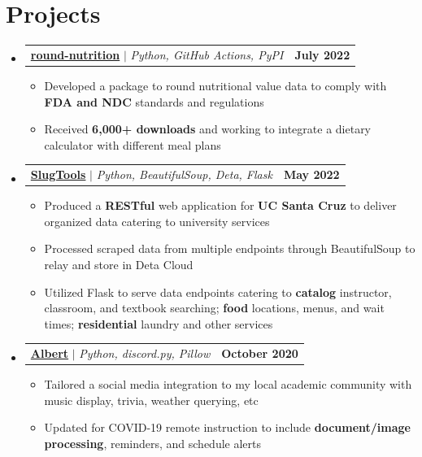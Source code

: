 \documentclass[letterpaper,11pt]{article}
\makeatletter
\newcommand{\resumeItem}[1]{
  \item\small{
    {#1 \vspace{-2pt}}
  }
}
\newcommand{\resumeProjectHeading}[2]{
    \item
    \begin{tabular*}{1.001\textwidth}{l@{\extracolsep{\fill}}r}
      \small#1 & \textbf{\small #2}\\
    \end{tabular*}\vspace{-7pt}
}
\newcommand{\resumeSubHeadingListStart}{\begin{itemize}[leftmargin=0.0in, label={}]}
\newcommand{\resumeSubHeadingListEnd}{\end{itemize}}
\newcommand{\resumeItemListStart}{\begin{itemize}}
\newcommand{\resumeItemListEnd}{\end{itemize}\vspace{-5pt}}
\makeatother
\begin{document}
\section{Projects}
\vspace{-5pt}
\resumeSubHeadingListStart

\resumeProjectHeading
{\textbf{\color[HTML]{0000EE}\href{https://pypi.org/project/round-nutrition/}{round-nutrition}} $|$ \emph{Python, GitHub Actions, PyPI}}{July 2022}
\resumeItemListStart
\resumeItem{Developed a package to round nutritional value data to comply with \textbf{FDA and NDC} standards and regulations}
\resumeItem{Received \textbf{6,000+ downloads} and working to integrate a dietary calculator with different meal plans}
\resumeItemListEnd

\vspace{-15pt}
\resumeProjectHeading
{\textbf{\color[HTML]{0000EE}\href{https://api.slug.tools}{SlugTools}} $|$ \emph{Python, BeautifulSoup, Deta, Flask}}{May 2022}
\resumeItemListStart
\resumeItem{Produced a \textbf{RESTful} web application for \textbf{UC Santa Cruz} to deliver organized data catering to university services}
\resumeItem{Processed scraped data from multiple  endpoints through BeautifulSoup to relay and store in Deta Cloud}
\resumeItem{Utilized Flask to serve data endpoints catering to \textbf{catalog} instructor, classroom, and textbook searching; \textbf{food} locations, menus, and wait times; \textbf{residential} laundry and other services}
\resumeItemListEnd

\vspace{-15pt}
\resumeProjectHeading
{\textbf{\color[HTML]{0000EE}\href{https://github.com/hdadhich01/Albert}{Albert}} $|$ \emph{Python, discord.py, Pillow}}{October 2020}
\resumeItemListStart
\resumeItem{Tailored a social media integration to my local academic community with music display, trivia, weather querying, etc}
\resumeItem{Updated for COVID-19 remote instruction to include \textbf{document/image processing}, reminders, and schedule alerts}
\resumeItemListEnd

\resumeSubHeadingListEnd
\vspace{-10pt}

\end{document}
